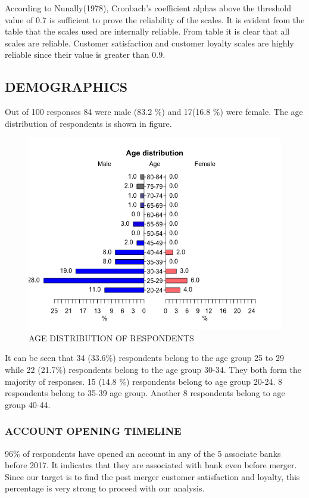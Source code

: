 \documentclass[a4paper, 12pt]{extarticle}
\begin{document}
{\par According to Nunally(1978), Cronbach's coefficient alphas above the threshold value of 0.7 is sufficient to prove the reliability of the scales. It is evident from the table that the scales used are internally reliable. From table it is clear that all scales are reliable. Customer satisfaction and customer loyalty scales are highly reliable since their value is greater than 0.9.

\subsection{DEMOGRAPHICS}
Out of 100 responses 84 were male (83.2 \%) and 17(16.8 \%) were female. The age distribution of respondents is shown in figure.
\begin{figure}[H]
\centering
\includegraphics[scale=0.7]{age.png}
\caption{AGE DISTRIBUTION OF RESPONDENTS}
\end{figure}
It can be seen that 34 (33.6\%) respondents belong to the age group 25 to 29 while 22 (21.7\%) respondents belong to the age group 30-34. They both form the majority of responses. 15 (14.8 \%) respondents belong to age group 20-24. 8 respondents belong to 35-39 age group. Another 8 respondents belong to age group 40-44.

\subsubsection{ACCOUNT OPENING TIMELINE}
96\% of respondents have opened an account in any of the 5 associate banks before 2017. It indicates that they are associated with bank even before merger. Since our target is to find the post merger customer satisfaction and loyalty, this percentage is very strong to proceed with our analysis.

}
\end{document}
